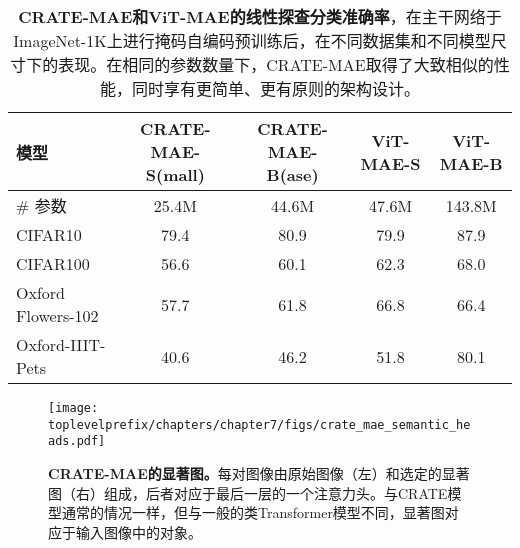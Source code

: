 \documentclass[../../book-main_zh.tex]{subfiles}
\begin{document}
\begin{table}
    \centering 
    \begin{tabular}{@{}lcc|cc@{}}
        \toprule 
        \textbf{模型} & CRATE-MAE-S(mall) & CRATE-MAE-B(ase) & {\color{gray} ViT-MAE-S} & {\color{gray} ViT-MAE-B} \\
        \midrule
        \midrule
        \# 参数 & 25.4M & 44.6M & 47.6M & {\color{gray}143.8M} \\
        \midrule
        CIFAR10 & 79.4 & 80.9 & {\color{gray} 79.9} & {\color{gray} 87.9} \\
        CIFAR100 & 56.6 & 60.1 & {\color{gray} 62.3} & {\color{gray} 68.0} \\
        Oxford Flowers-102 & 57.7 & 61.8 & {\color{gray} 66.8} & {\color{gray} 66.4} \\
        Oxford-IIIT-Pets & 40.6 & 46.2 & {\color{gray} 51.8} & {\color{gray} 80.1} \\
        \bottomrule
    \end{tabular}
    \caption{\small\textbf{CRATE-MAE和ViT-MAE的线性探查分类准确率}，在主干网络于ImageNet-1K上进行掩码自编码预训练后，在不同数据集和不同模型尺寸下的表现。在相同的参数数量下，CRATE-MAE取得了大致相似的性能，同时享有更简单、更有原则的架构设计。}
    \label{tab:crate_mae_linear_probing}
\end{table}

\begin{figure}
    \centering 
    \texttt{[image: \\toplevelprefix/chapters/chapter7/figs/crate\_mae\_semantic\_heads.pdf]}
    \caption{\small\textbf{CRATE-MAE的显著图。}每对图像由原始图像（左）和选定的显著图（右）组成，后者对应于最后一层的一个注意力头。与CRATE模型通常的情况一样，但与一般的类Transformer模型不同，显著图对应于输入图像中的对象。}
    \label{fig:crate_mae_semantic_heads}
\end{figure}




\end{document}
